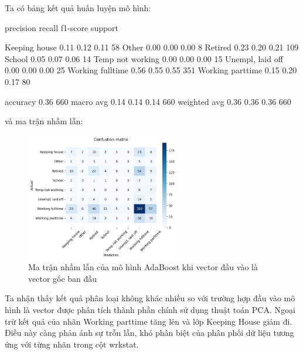 \begin{enumerate}[label=(\alph*)]
    Ta có bảng kết quả huấn luyện mô hình:

    \begin{python}
                    precision    recall  f1-score   support

   Keeping house       0.11      0.12      0.11        58
           Other       0.00      0.00      0.00         8
         Retired       0.23      0.20      0.21       109
          School       0.05      0.07      0.06        14
Temp not working       0.00      0.00      0.00        15
Unempl, laid off       0.00      0.00      0.00        25
Working fulltime       0.56      0.55      0.55       351
Working parttime       0.15      0.20      0.17        80

        accuracy                           0.36       660
       macro avg       0.14      0.14      0.14       660
    weighted avg       0.36      0.36      0.36       660
    \end{python}

    và ma trận nhầm lẫn:

    \begin{figure}[H]
        \centering
        \includegraphics[width=0.6\textwidth]{figures/Thanh/Models/AdaBoost/Non_null_models_confusion_matrix_AdaBoost_original_features.png}
        \caption{Ma trận nhầm lẫn của mô hình AdaBoost khi vector đầu vào là vector gốc ban đầu}
        \label{fig:Non_null_models_confusion_matrix_AdaBoost_original_features}
    \end{figure}
    
    Ta nhận thấy kết quả phân loại không khác nhiều so với trường hợp đầu vào mô hình là vector được phân tích thành phần chính sử dụng thuật toán PCA.
    Ngoại trừ kết quả của nhãn Working parttime tăng lên và lớp Keeping House giảm đi.
    Điều này càng phản ánh sự trỗn lẫn, khó phân biệt của phân phối dữ liệu tương ứng với từng nhãn trong cột wrkstat.


\end{enumerate}
